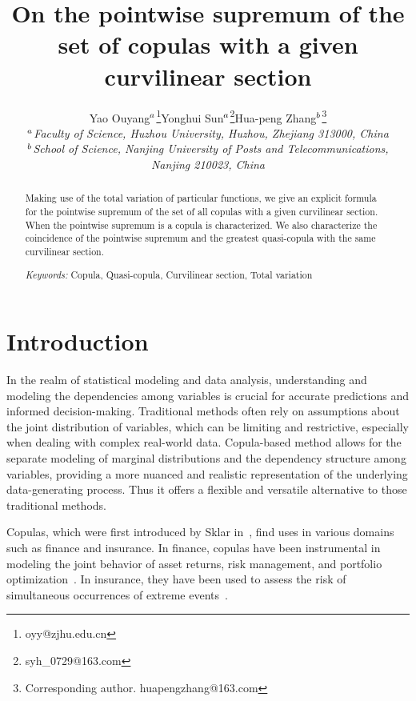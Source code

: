 \documentclass[12pt]{article}
\theoremstyle{plain}
\theoremstyle{definition}
\begin{document}
 \title{\bf On the pointwise supremum of the set of copulas with a given curvilinear section}
\author{
Yao Ouyang$\sp{a}$\thanks{oyy@zjhu.edu.cn}\qquad Yonghui Sun$\sp{a}$\thanks{syh\_0729@163.com}\qquad Hua-peng Zhang$\sp{b}$\thanks{Corresponding author. huapengzhang@163.com}\\
 $\sp{a}$\small\it Faculty of Science, Huzhou University, Huzhou, Zhejiang 313000, China \\
$\sp{b}$\small\it School of Science, Nanjing University of Posts and Telecommunications, \\ \small\it Nanjing 210023, China \\
}
\date{}
\maketitle
\begin{abstract}
Making use of the total variation of particular functions, we give an explicit formula for the pointwise supremum of the set of all copulas with a given curvilinear section. When the pointwise supremum is a copula is characterized. We also characterize the coincidence of the pointwise supremum and the greatest quasi-copula with the same curvilinear section.

{\it Keywords:} Copula, Quasi-copula, Curvilinear section, Total variation
\end{abstract}
\section{Introduction}

In the realm of statistical modeling and data analysis, understanding and modeling the dependencies among variables is crucial for accurate predictions and informed decision-making. Traditional methods often rely on assumptions about the joint distribution of variables, which can be limiting and restrictive, especially when dealing with complex real-world data. Copula-based method \cite{GR10,J14,TWSH19} allows for the separate modeling of marginal distributions and the dependency structure among variables, providing a more nuanced and realistic representation of the underlying data-generating process. Thus it offers a flexible and versatile alternative to those traditional methods.

Copulas, which were first introduced by Sklar in~\cite{S59}, find uses in various domains such as finance and insurance. In finance, copulas have been instrumental in modeling the joint behavior of asset returns, risk management, and portfolio optimization~\cite{CLV04}. In insurance, they have been used to assess the risk of simultaneous occurrences of extreme events~\cite{FM13}.
\end{document}
